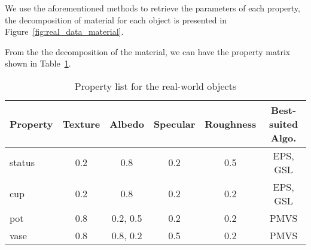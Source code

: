 We use the aforementioned methods to retrieve the parameters of each property, the decomposition of material for each object is presented in Figure~\ref{fig:real_data_material}.

From the the decomposition of the material, we can have the property matrix shown in Table~\ref{tab:real_data_prop_list}.
\begin{table}[!htbp]
  \centering
  \begin{tabular}{l*{5}{c}}
  \hline
  \textbf{Property} & Texture & Albedo & Specular & Roughness & Best-suited Algo.\\
  \hline
  status & 0.2 & 0.8 & 0.2 & 0.5 & EPS, GSL\\
  cup & 0.2 & 0.8 & 0.2 & 0.2 & EPS, GSL\\
  pot & 0.8 & 0.2, 0.5 & 0.2 & 0.2 & PMVS\\
  vase & 0.8 & 0.8, 0.2 & 0.5 & 0.2 & PMVS\\
  \hline
  \end{tabular}
  \caption{Property list for the real-world objects}
  \label{tab:real_data_prop_list}
\end{table}

